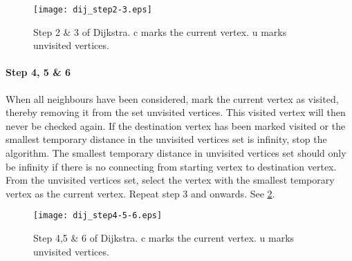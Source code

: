   \begin{figure}[ht!]
    \centering
    \texttt{[image: dij\_step2-3.eps]}
    \caption{Step 2 \& 3 of Dijkstra. c marks the current vertex. u marks unvisited vertices.}
    \label{fig:dij_step2-3}
  \end{figure}

      \paragraph{Step 4, 5 \& 6}
When all neighbours have been considered, mark the current vertex as visited, thereby removing it from the set unvisited vertices. This visited vertex will then never be checked again. If the destination vertex has been marked visited or the smallest temporary distance in the unvisited vertices set is infinity, stop the algorithm. The smallest temporary distance in unvisited vertices set should only be infinity if there is no connecting from starting vertex to destination vertex.
From the unvisited vertices set, select the vertex with the smallest temporary vertex as the current vertex. Repeat step 3 and onwards. See \cref{fig:dij_step4-5-6}.

  \begin{figure}[ht!]
    \centering
    \texttt{[image: dij\_step4-5-6.eps]}
    \caption{Step 4,5 \& 6 of Dijkstra. c marks the current vertex. u marks unvisited vertices.}
    \label{fig:dij_step4-5-6}
  \end{figure}







